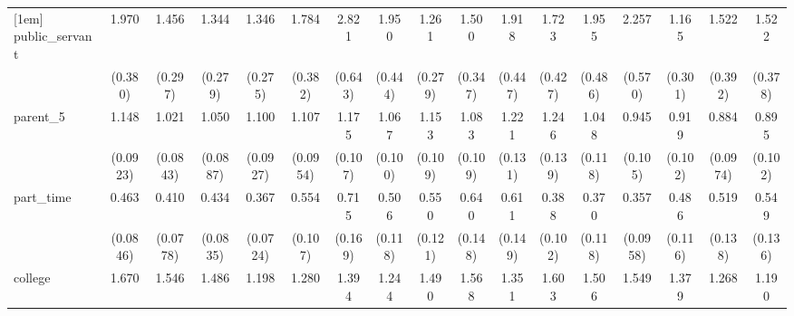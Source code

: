 {\begin{tabular}{l*{16}{c}}
[1em]
public\_servant      &       1.970\sym{***}&       1.456         &       1.344         &       1.346         &       1.784\sym{**} &       2.821\sym{***}&       1.950\sym{**} &       1.261         &       1.500         &       1.918\sym{**} &       1.723\sym{*}  &       1.955\sym{**} &       2.257\sym{**} &       1.165         &       1.522         &       1.522         \\
                    &     (0.380)         &     (0.297)         &     (0.279)         &     (0.275)         &     (0.382)         &     (0.643)         &     (0.444)         &     (0.279)         &     (0.347)         &     (0.447)         &     (0.427)         &     (0.486)         &     (0.570)         &     (0.301)         &     (0.392)         &     (0.378)         \\
[1em]
parent\_5            &       1.148         &       1.021         &       1.050         &       1.100         &       1.107         &       1.175         &       1.067         &       1.153         &       1.083         &       1.221         &       1.246\sym{*}  &       1.048         &       0.945         &       0.919         &       0.884         &       0.895         \\
                    &    (0.0923)         &    (0.0843)         &    (0.0887)         &    (0.0927)         &    (0.0954)         &     (0.107)         &     (0.100)         &     (0.109)         &     (0.109)         &     (0.131)         &     (0.139)         &     (0.118)         &     (0.105)         &     (0.102)         &    (0.0974)         &     (0.102)         \\
[1em]
part\_time           &       0.463\sym{***}&       0.410\sym{***}&       0.434\sym{***}&       0.367\sym{***}&       0.554\sym{**} &       0.715         &       0.506\sym{**} &       0.550\sym{**} &       0.640         &       0.611\sym{*}  &       0.388\sym{***}&       0.370\sym{**} &       0.357\sym{***}&       0.486\sym{**} &       0.519\sym{*}  &       0.549\sym{*}  \\
                    &    (0.0846)         &    (0.0778)         &    (0.0835)         &    (0.0724)         &     (0.107)         &     (0.169)         &     (0.118)         &     (0.121)         &     (0.148)         &     (0.149)         &     (0.102)         &     (0.118)         &    (0.0958)         &     (0.116)         &     (0.138)         &     (0.136)         \\
[1em]
college             &       1.670\sym{***}&       1.546\sym{***}&       1.486\sym{***}&       1.198         &       1.280\sym{*}  &       1.394\sym{**} &       1.244         &       1.490\sym{**} &       1.568\sym{***}&       1.351\sym{*}  &       1.603\sym{**} &       1.506\sym{**} &       1.549\sym{**} &       1.379\sym{*}  &       1.268         &       1.190         \\

\end{tabular}}
